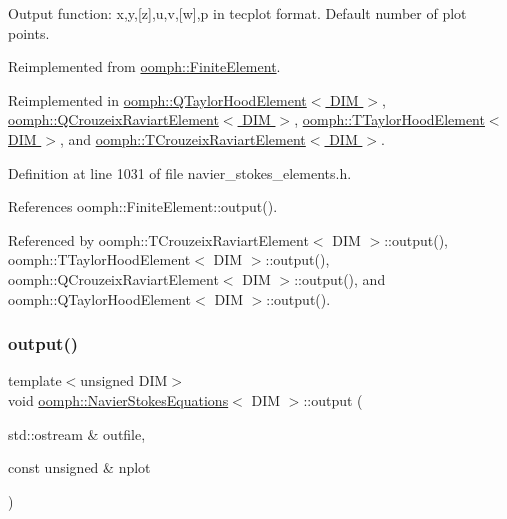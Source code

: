Output function\+: x,y,\mbox{[}z\mbox{]},u,v,\mbox{[}w\mbox{]},p in tecplot format. Default number of plot points. 



Reimplemented from \hyperlink{classoomph_1_1FiniteElement_a2ad98a3d2ef4999f1bef62c0ff13f2a7}{oomph\+::\+Finite\+Element}.



Reimplemented in \hyperlink{classoomph_1_1QTaylorHoodElement_a66200b671d6b16402d0d89c382af2f95}{oomph\+::\+Q\+Taylor\+Hood\+Element$<$ D\+I\+M $>$}, \hyperlink{classoomph_1_1QCrouzeixRaviartElement_a0d152892ee354f495bbaced9e423b541}{oomph\+::\+Q\+Crouzeix\+Raviart\+Element$<$ D\+I\+M $>$}, \hyperlink{classoomph_1_1TTaylorHoodElement_ac811dc5fb7c1dcad508cf2e4759bef32}{oomph\+::\+T\+Taylor\+Hood\+Element$<$ D\+I\+M $>$}, and \hyperlink{classoomph_1_1TCrouzeixRaviartElement_a9d8ebc6516e9c98a4fefdea2a821356d}{oomph\+::\+T\+Crouzeix\+Raviart\+Element$<$ D\+I\+M $>$}.



Definition at line 1031 of file navier\+\_\+stokes\+\_\+elements.\+h.



References oomph\+::\+Finite\+Element\+::output().



Referenced by oomph\+::\+T\+Crouzeix\+Raviart\+Element$<$ D\+I\+M $>$\+::output(), oomph\+::\+T\+Taylor\+Hood\+Element$<$ D\+I\+M $>$\+::output(), oomph\+::\+Q\+Crouzeix\+Raviart\+Element$<$ D\+I\+M $>$\+::output(), and oomph\+::\+Q\+Taylor\+Hood\+Element$<$ D\+I\+M $>$\+::output().

\mbox{\label{classoomph_1_1NavierStokesEquations_a2bc96a264dad4175d1aca7946db5f303}} 
\subsubsection{\texorpdfstring{output()}{output()}\hspace{0.1cm}{\footnotesize\ttfamily [2/4]}}
{\footnotesize\ttfamily template$<$unsigned D\+IM$>$ \\
void \hyperlink{classoomph_1_1NavierStokesEquations}{oomph\+::\+Navier\+Stokes\+Equations}$<$ D\+IM $>$\+::output (\begin{DoxyParamCaption}\item[{std\+::ostream \&}]{outfile,  }\item[{const unsigned \&}]{nplot }\end{DoxyParamCaption})\hspace{0.3cm}{\ttfamily [virtual]}}



